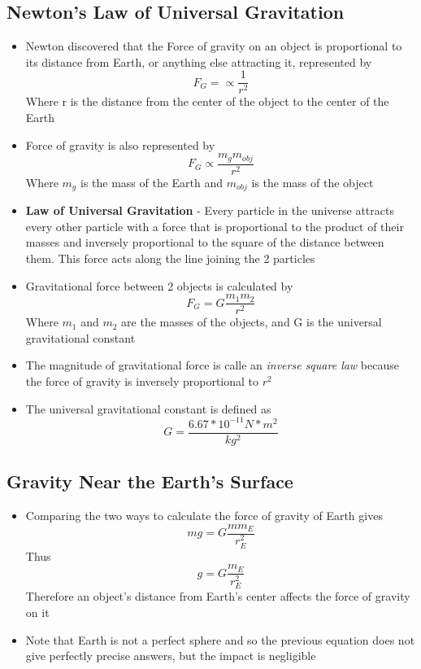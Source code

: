 \subsection{Newton's Law of Universal Gravitation}
\begin{itemize}
    \item Newton discovered that the Force of gravity on an object is proportional to its distance from Earth, or anything else attracting it, represented by \[F_G=\propto\frac{1}{r^2}\] Where r is the distance from the center of the object to the center of the Earth
    \item Force of gravity is also represented by \[F_G\propto\frac{m_gm_{obj}}{r^2}\] Where $m_g$ is the mass of the Earth and $m_{obj}$ is the mass of the object
    \item \textbf{Law of Universal Gravitation} - Every particle in the universe attracts every other particle with a force that is proportional to the product of their masses and inversely proportional to the square of the distance between them. This force acts along the line joining the 2 particles
    \item Gravitational force between 2 objects is calculated by \[F_G=G\frac{m_1m_2}{r^2}\] Where $m_1$ and $m_2$ are the masses of the objects, and G is the universal gravitational constant
    \item The magnitude of gravitational force is calle an \emph{inverse square law} because the force of gravity is inversely proportional to $r^2$
    \item The universal gravitational constant is defined as \[G=\frac{6.67*10^{-11}N*m^2}{kg^2}\]
\end{itemize}

\subsection{Gravity Near the Earth's Surface}
\begin{itemize}
    \item Comparing the two ways to calculate the force of gravity of Earth gives \[mg=G\frac{mm_E}{r_E^2}\] Thus \[g=G\frac{m_E}{r_E^2}\] Therefore an object's distance from Earth's center affects the force of gravity on it
    \item Note that Earth is not a perfect sphere and so the previous equation does not give perfectly precise answers, but the impact is negligible
\end{itemize}

